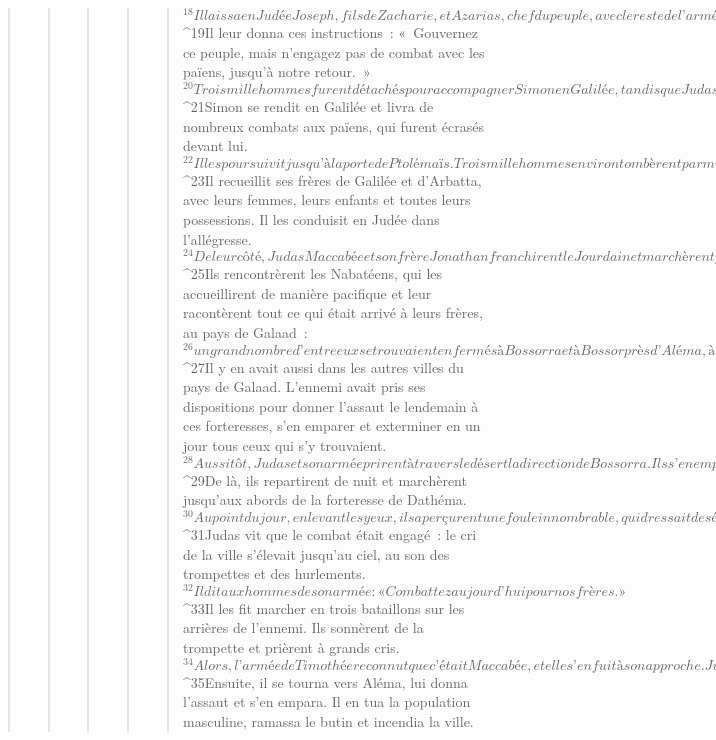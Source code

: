 \begin{verse}
\begin{verse}
\begin{verse}
\begin{verse}
\begin{verse}
${}^{18}Il laissa en Judée Joseph, fils de Zacharie, et Azarias, chef du peuple, avec le reste de l’armée, pour assurer la garde. 
${}^{19}Il leur donna ces instructions : « Gouvernez ce peuple, mais n’engagez pas de combat avec les païens, jusqu’à notre retour. » 
${}^{20}Trois mille hommes furent détachés pour accompagner Simon en Galilée, tandis que Judas emmenait huit mille hommes au pays de Galaad.
${}^{21}Simon se rendit en Galilée et livra de nombreux combats aux païens, qui furent écrasés devant lui. 
${}^{22}Il les poursuivit jusqu’à la porte de Ptolémaïs. Trois mille hommes environ tombèrent parmi les païens, et Simon ramassa le butin. 
${}^{23}Il recueillit ses frères de Galilée et d’Arbatta, avec leurs femmes, leurs enfants et toutes leurs possessions. Il les conduisit en Judée dans l’allégresse.
${}^{24}De leur côté, Judas Maccabée et son frère Jonathan franchirent le Jourdain et marchèrent pendant trois jours dans le désert. 
${}^{25}Ils rencontrèrent les Nabatéens, qui les accueillirent de manière pacifique et leur racontèrent tout ce qui était arrivé à leurs frères, au pays de Galaad : 
${}^{26}un grand nombre d’entre eux se trouvaient enfermés à Bossorra et à Bossor près d’Aléma, à Kaspho, à Maked et à Carnaïn, qui sont toutes de grandes et fortes villes. 
${}^{27}Il y en avait aussi dans les autres villes du pays de Galaad. L’ennemi avait pris ses dispositions pour donner l’assaut le lendemain à ces forteresses, s’en emparer et exterminer en un jour tous ceux qui s’y trouvaient. 
${}^{28}Aussitôt, Judas et son armée prirent à travers le désert la direction de Bossorra. Ils s’en emparèrent, passèrent toute la population masculine au fil de l’épée, ramassèrent tout le butin et incendièrent la ville. 
${}^{29}De là, ils repartirent de nuit et marchèrent jusqu’aux abords de la forteresse de Dathéma. 
${}^{30}Au point du jour, en levant les yeux, ils aperçurent une foule innombrable, qui dressait des échelles et des machines de guerre pour s’emparer de la forteresse ; déjà on attaquait. 
${}^{31}Judas vit que le combat était engagé : le cri de la ville s’élevait jusqu’au ciel, au son des trompettes et des hurlements. 
${}^{32}Il dit aux hommes de son armée : « Combattez aujourd’hui pour nos frères. »
${}^{33}Il les fit marcher en trois bataillons sur les arrières de l’ennemi. Ils sonnèrent de la trompette et prièrent à grands cris. 
${}^{34}Alors, l’armée de Timothée reconnut que c’était Maccabée, et elle s’enfuit à son approche. Judas les frappa durement, et huit mille hommes environ tombèrent ce jour-là. 
${}^{35}Ensuite, il se tourna vers Aléma, lui donna l’assaut et s’en empara. Il en tua la population masculine, ramassa le butin et incendia la ville. 

\end{verse}
\end{verse}
\end{verse}
\end{verse}
\end{verse}
